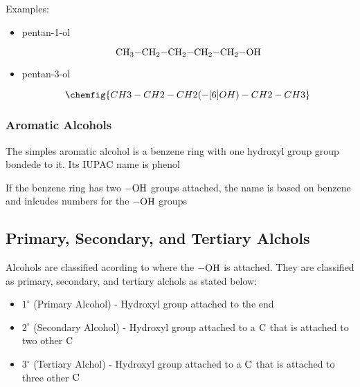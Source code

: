 \documentclass[12pt, a4paper]{article}
\newcommand{\C}{\ce{C}}
\begin{document}
    \noindent Examples:

    \begin{itemize}
        
        \item pentan-1-ol 
        
        \[
            \ce{CH3-CH2-CH2-CH2-CH2-OH}    
        \]

        \item pentan-3-ol
        
        \[
            \chemfig{CH3-CH2-CH2(-[6]OH)-CH2-CH3}    
        \]

    \end{itemize}

    \subsubsection{Aromatic Alcohols}

    The simples aromatic alcohol is a benzene ring with one hydroxyl group group
    bondede to it. Its IUPAC name is phenol

    \begin{center}
    \end{center}

    If the benzene ring has two $\ce{-OH}$ groups attached, the name is based on benzene
    and inlcudes numbers for the $\ce{-OH}$ groups

    \begin{center}
    \end{center}

    \subsection{Primary, Secondary, and Tertiary Alchols}

    Alcohols are classified acording to where the $\ce{-OH}$ is attached. They
    are classified as primary, secondary, and tertiary alchols as stated below:

    \begin{itemize}
        \item $1^{\circ}$ (Primary Alcohol) - Hydroxyl group attached to the end 
        \item $2^{\circ}$ (Secondary Alcohol) - Hydroxyl group attached to a $\ce{C}$ that is attached
                          to two other $\ce{C}$%
        \item $3^{\circ}$ (Tertiary Alchol) - Hydroxyl group attached to a $\C$ that is attached to
                          three other $\C$
    \end{itemize}
\end{document}

